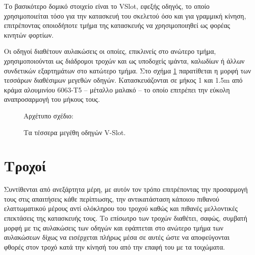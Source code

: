 Το βασικότερο δομικό στοιχείο είναι το VSlot, εφεξής οδηγός, το οποίο
χρησιμοποιείται τόσο για την κατασκευή του σκελετού όσο και για γραμμική κίνηση,
επιτρέποντας οποιοδήποτε τμήμα της κατασκευής να χρησιμοποιηθεί ως φορέας
κινητών φορτίων.

Οι οδηγοί διαθέτουν αυλακώσεις οι οποίες, επικλινείς στο ανώτερο τμήμα,
χρησιμοποιούνται ως διάδρομοι τροχών και ως υποδοχείς ιμάντα, καλωδίων ή άλλων
συνδετικών εξαρτημάτων στο κατώτερο τμήμα.
Στο σχήμα \ref{fig:construct:vslot} παρατίθεται η μορφή των τεσσάρων διαθέσιμων
μεγεθών οδηγών.
Κατασκευάζονται σε μήκος 1 και 1.5m από κράμα αλουμινίου 6063-T5 -- μέταλλο
μαλακό -- το οποίο επιτρέπει την εύκολη αναπροσαρμογή του μήκους τους.

\begin{figure}
    \caption{Τα τέσσερα μεγέθη οδηγών V-Slot.
    \label{fig:construct:vslot}}
    \begin{center}%
    \def\svgwidth{0.8\textwidth}
    
    \end{center}

    Αρχέτυπο σχέδιο:
\end{figure}

\section{Τροχοί}

Συντίθενται από ανεξάρτητα μέρη, με αυτόν τον τρόπο επιτρέποντας την προσαρμογή
τους στις απαιτήσεις κάθε περίπτωσης, την αντικατάσταση κάποιου πιθανού
ελαττωματικού μέρους αντί ολόκληρου του τροχού καθώς και πιθανές μελλοντικές
επεκτάσεις της κατασκευής τους.
Το επίσωτρο των τροχών διαθέτει, σαφώς, συμβατή μορφή με τις αυλακώσεις των
οδηγών και εφάπτεται στο ανώτερο τμήμα των αυλακώσεων δίχως να εισέρχεται πλήρως
μέσα σε αυτές ώστε να αποφεύγονται φθορές στον τροχό κατά την κίνησή του από την
επαφή του με τα τοιχώματα.

